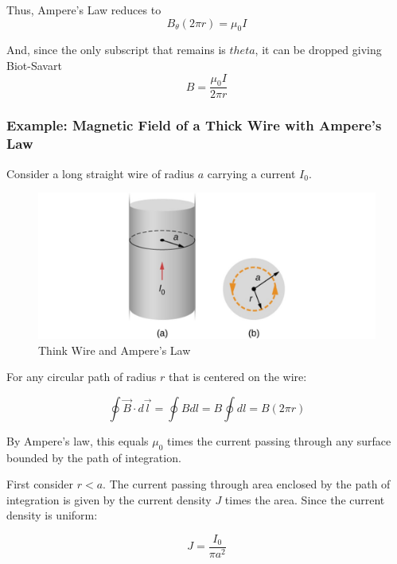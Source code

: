 \documentclass[14pt]{memoir}
\begin{document}
Thus, Ampere's Law reduces to
\begin{equation}
B_\theta (2 \pi r) = \mu_0 I
\end{equation}

And, since the only subscript that remains is $theta$, it can be dropped giving Biot-Savart
\begin{equation}
B = \frac{\mu_0 I}{2 \pi r}
\end{equation}

\subsubsection{Example: Magnetic Field of a Thick Wire with Ampere's Law}

Consider a long straight wire of radius $a$ carrying a current $I_0$. 

\begin{figure}[H]
\begin{center}
\includegraphics[scale=0.5]{fig/fig_12_16.jpg}
\caption{Think Wire and Ampere's Law}
\label{fig:12_16}
\end{center}
\end{figure}

For any circular path of radius $r$ that is centered on the wire:

\begin{equation}
\oint \vec{B} \cdot d \vec{l} = \oint B dl = B \oint dl = B (2 \pi r)
\end{equation}

By Ampere's law, this equals $\mu_0$ times the current passing through any surface bounded by the path of integration. 

First consider $r < a$. The current passing through area enclosed by the path of integration is given by the current density $J$ times the area. Since the current density is uniform:

\begin{equation}
J = \frac{I_0}{\pi a^2}
\end{equation}
\end{document}
